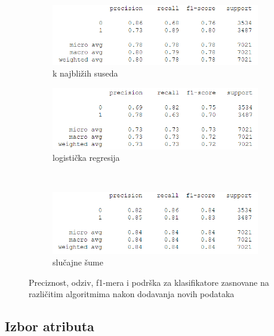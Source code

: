 \documentclass[12pt,oneside]{memoir}
\begin{document}
\begin{figure}[!ht]
    \centering
    \begin{subfigure}[b]{0.45\textwidth}
        \centering
        \includegraphics[width=\textwidth]{knn2}
        \caption{k najbližih suseda}
        \label{fig:kn3}
    \end{subfigure}
    \begin{subfigure}[b]{0.45\textwidth}
        \centering
        \includegraphics[width=\textwidth]{logreg2}
        \caption{logistička regresija}
        \label{fig:logreg3}
    \end{subfigure}
    \\
    \begin{subfigure}[b]{0.45\textwidth}
        \centering
        \includegraphics[width=\textwidth]{randfor2}
        \caption{slučajne šume}
        \label{fig:randfor3}
    \end{subfigure}
    \caption{Preciznost, odziv, f1-mera i podrška za klasifikatore zasnovane na različitim algoritmima nakon dodavanja novih podataka}
    \label{fig:dodatno2}
\end{figure}


\subsection{Izbor atributa}
\end{document}
